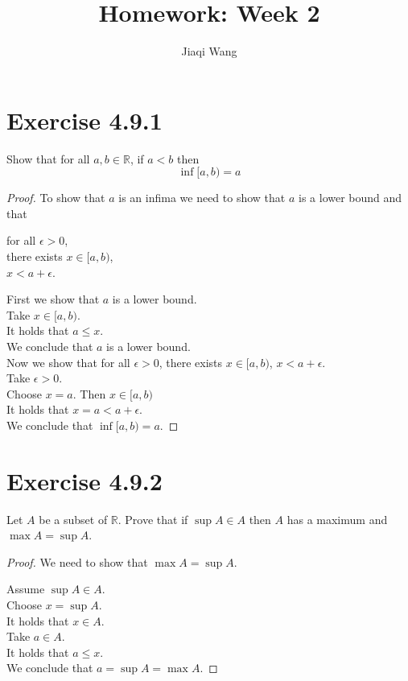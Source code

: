 \documentclass{article}
\title{Homework: Week 2}
\author{Jiaqi Wang}
\theoremstyle{mytheoremstyle}
\theoremstyle{mytheoremstyle}
\theoremstyle{myproblemstyle}
\begin{document}
    \maketitle

    \section{Exercise 4.9.1}
    \begin{problem}
        Show that for all $a,b \in \mathbb{R}$, if $a < b$ then
        $$\inf[a,b) = a$$
    \end{problem}
    \begin{proof}
        To show that $a$ is an infima we need to show that $a$ is a lower bound and that
        \begin{center}
            for all $\epsilon > 0$, \\
            there exists $x \in [a,b)$, \\
            $x < a + \epsilon$.
        \end{center}

        First we show that $a$ is a lower bound. \\
        Take $x \in [a,b)$. \\
        It holds that $a \le x$. \\
        We conclude that $a$ is a lower bound. \\

        Now we show that for all $\epsilon > 0$, there exists $x \in [a,b)$, $x < a + \epsilon$. \\
        Take $\epsilon > 0$. \\
        Choose $x = a$. Then $x \in [a,b)$ \\
        It holds that $x = a < a + \epsilon$. \\
        We conclude that $\inf [a,b) = a$.
    \end{proof}

    \section{Exercise 4.9.2}
    \begin{problem}
        Let $A$ be a subset of $\mathbb{R}$. Prove that if $\sup A \in A$ then $A$ has a maximum and $\max A = \sup A$.
    \end{problem}
    \begin{proof}
        We need to show that $\max A = \sup A$.
        
        \noindent Assume $\sup A \in A$. \\
        Choose $x = \sup A$. \\
        It holds that $x \in A$. \\
        Take $a \in A$. \\
        It holds that $a \le x$. \\
        We conclude that $a = \sup A = \max A$.
    \end{proof}
\end{document}
